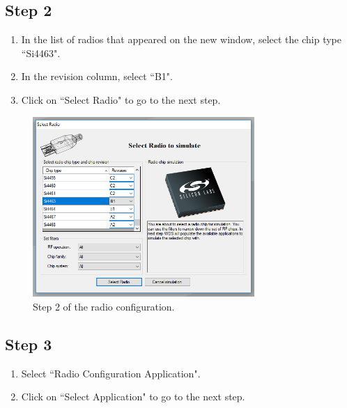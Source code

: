 \documentclass[12pt]{book}
\begin{document}
\begin{appendices}
\subsection{Step 2}

\begin{enumerate}
    \item In the list of radios that appeared on the new window, select the chip type ``Si4463".
    \item In the revision column, select ``B1".
    \item Click on ``Select Radio" to go to the next step.
\end{enumerate}

\begin{figure}[!h]
	\begin{center}
		\includegraphics[width=0.75\textwidth]{figures/wds-tutorial-2.png}
		\caption{Step 2 of the radio configuration.}
		\label{fig:wds-tutorial-step-2}
	\end{center}
\end{figure}

\subsection{Step 3}

\begin{enumerate}
    \item Select ``Radio Configuration Application".
    \item Click on ``Select Application" to go to the next step.
\end{enumerate}


\end{appendices}
\end{document}
